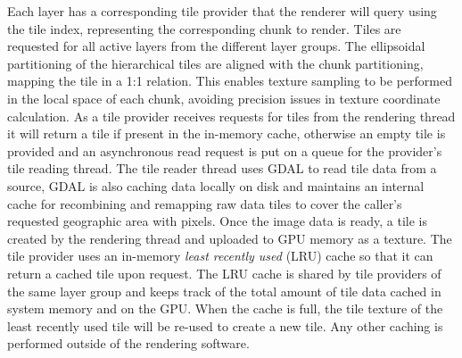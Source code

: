 \documentclass[journal]{vgtc}                %
\begin{document}
Each layer has a corresponding tile provider that the renderer will query using the tile index, representing the corresponding chunk to render.
Tiles are requested for all active layers from the different layer groups.
The ellipsoidal partitioning of the hierarchical tiles are aligned with the chunk partitioning, mapping the tile in a 1:1 relation. This enables texture sampling to be performed in the local space of each chunk, avoiding precision issues in texture coordinate calculation.
As a tile provider receives requests for tiles from the rendering thread it will return a tile if present in the in-memory cache, otherwise an empty tile is provided and an asynchronous read request is put on a queue for the provider's tile reading thread.
The tile reader thread uses GDAL to read tile data from a source, GDAL is also caching data locally on disk and maintains an internal cache for recombining and remapping raw data tiles to cover the caller's requested geographic area with pixels.
Once the image data is ready, a tile is created by the rendering thread and uploaded to GPU memory as a texture.
The tile provider uses an in-memory \emph{least recently used} (LRU) cache so that it can return a cached tile upon request.
The LRU cache is shared by tile providers of the same layer group and keeps track of the total amount of tile data cached in system memory and on the GPU. When the cache is full, the tile texture of the least recently used tile will be re-used to create a new tile.
Any other caching is performed outside of the rendering software.

\end{document}
